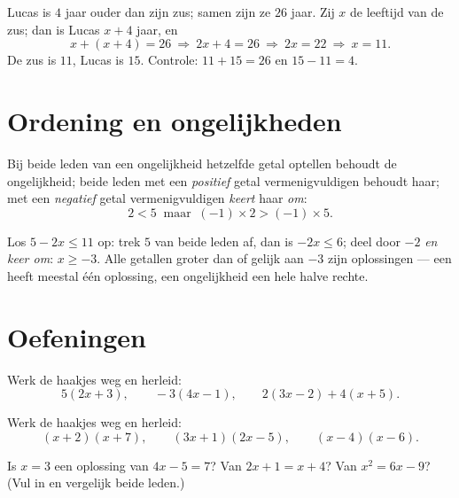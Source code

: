\begin{example}\label{ex:g8:equations:problem}
Lucas is $4$ jaar ouder dan zijn zus; samen zijn ze $26$ jaar. Zij $x$ de
leeftijd van de zus; dan is Lucas $x + 4$ jaar, en
\[
x + (x + 4) = 26
\ \Longrightarrow\
2x + 4 = 26
\ \Longrightarrow\
2x = 22
\ \Longrightarrow\
x = 11 .
\]
De zus is $11$, Lucas is $15$. Controle: $11 + 15 = 26$ en
$15 - 11 = 4$.
\end{example}

\section{Ordening en ongelijkheden}

\begin{proposition}\label{prop:g8:equations:order}
Bij beide leden van een ongelijkheid hetzelfde getal optellen behoudt de
ongelijkheid; beide leden met een \emph{positief} getal vermenigvuldigen behoudt
haar; met een \emph{negatief} getal vermenigvuldigen \emph{keert} haar
\emph{om}:
\[
2 < 5 \ \text{ maar }\ (-1) \times 2 > (-1) \times 5 .
\]
\end{proposition}
\admitted

\begin{example}\label{ex:g8:equations:inequality}
Los $5 - 2x \leq 11$ op: trek $5$ van beide leden af, dan is $-2x \leq 6$; deel
door $-2$ \emph{en keer om}: $x \geq -3$. Alle getallen groter dan of gelijk aan
$-3$ zijn oplossingen --- een  heeft meestal één oplossing, een
ongelijkheid een hele halve rechte.
\end{example}

\section{Oefeningen}

\begin{exercise}[$\star$]\label{exo:g8:equations:1}
Werk de haakjes weg en herleid:
\[
5(2x + 3), \qquad
-3(4x - 1), \qquad
2(3x - 2) + 4(x + 5).
\]
\end{exercise}

\begin{exercise}[$\star$]\label{exo:g8:equations:2}
Werk de haakjes weg en herleid:
\[
(x + 2)(x + 7), \qquad
(3x + 1)(2x - 5), \qquad
(x - 4)(x - 6).
\]
\end{exercise}

\begin{exercise}[$\star$]\label{exo:g8:equations:3}
Is $x = 3$ een oplossing van $4x - 5 = 7$? Van $2x + 1 = x + 4$? Van
$x^2 = 6x - 9$? (Vul in en vergelijk beide leden.)
\end{exercise}

